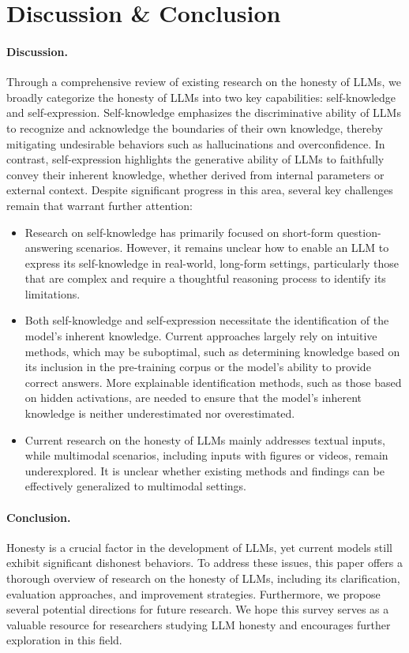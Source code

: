 \section{Discussion \& Conclusion}
\label{sec:conclusion}

\paragraph{Discussion.} Through a comprehensive review of existing research on the honesty of LLMs, we broadly categorize the honesty of LLMs into two key capabilities: self-knowledge and self-expression. Self-knowledge emphasizes the discriminative ability of LLMs to recognize and acknowledge the boundaries of their own knowledge, thereby mitigating undesirable behaviors such as hallucinations and overconfidence. In contrast, self-expression highlights the generative ability of LLMs to faithfully convey their inherent knowledge, whether derived from internal parameters or external context. Despite significant progress in this area, several key challenges remain that warrant further attention:
\begin{itemize}
\item Research on self-knowledge has primarily focused on short-form question-answering scenarios. However, it remains unclear how to enable an LLM to express its self-knowledge in real-world, long-form settings, particularly those that are complex and require a thoughtful reasoning process to identify its limitations.
\item Both self-knowledge and self-expression necessitate the identification of the model's inherent knowledge. Current approaches largely rely on intuitive methods, which may be suboptimal, such as determining knowledge based on its inclusion in the pre-training corpus or the model's ability to provide correct answers. More explainable identification methods, such as those based on hidden activations, are needed to ensure that the model's inherent knowledge is neither underestimated nor overestimated.
\item Current research on the honesty of LLMs mainly addresses textual inputs, while multimodal scenarios, including inputs with figures or videos, remain underexplored. It is unclear whether existing methods and findings can be effectively generalized to multimodal settings.
\end{itemize}

\paragraph{Conclusion.} Honesty is a crucial factor in the development of LLMs, yet current models still exhibit significant dishonest behaviors. To address these issues, this paper offers a thorough overview of research on the honesty of LLMs, including its clarification, evaluation approaches, and improvement strategies. Furthermore, we propose several potential directions for future research. We hope this survey serves as a valuable resource for researchers studying LLM honesty and encourages further exploration in this field.
